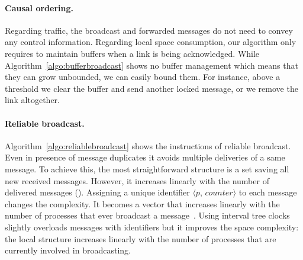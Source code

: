 \paragraph{Causal ordering.} Regarding traffic, the broadcast and forwarded
messages do not need to convey any control information. Regarding local space
consumption, our algorithm only requires to maintain buffers when a link is
being acknowledged. While Algorithm~\ref{algo:bufferbroadcast} shows no buffer
management which means that they can grow unbounded, we can easily bound
them. For instance, above a threshold we clear the buffer and send another
locked message, or we remove the link altogether.

\paragraph{Reliable broadcast.} Algorithm~\ref{algo:reliablebroadcast} shows the
instructions of reliable broadcast. Even in presence of message duplicates it
avoids multiple deliveries of a same message. To achieve this, the most
straightforward structure is a set saving all new received messages. However, it
increases linearly with the number of delivered messages (\REF). Assigning a
unique identifier $\langle p,\, counter \rangle$ to each message changes the
complexity. It becomes a vector that increases linearly with the number of
processes that ever broadcast a message~\cite{fidge1988timestamps}. Using
interval tree clocks~\cite{almeida2008interval} slightly overloads messages with
identifiers but it improves the space complexity: the local structure increases
linearly with the number of processes that are currently involved in
broadcasting.




